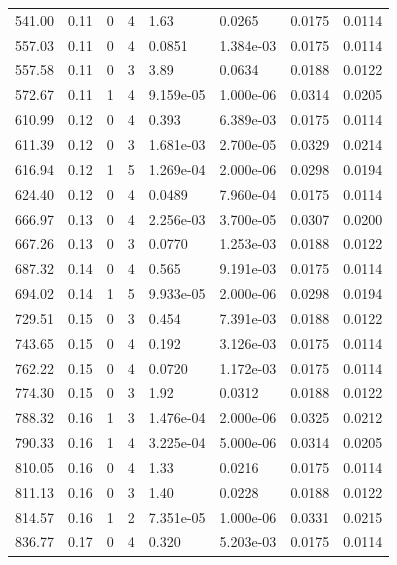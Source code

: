 \documentclass[preview]{standalone}
\begin{document}
{{{\begin{tabular}{L{1.2cm}C{1.2cm} C{0.3cm}C{0.5cm} C{1.4cm}C{1.4cm} C{1.4cm}C{1.4cm}}
  541.00  &  0.11  & 0     &  4 &  1.63  & 0.0265  & 0.0175 &  0.0114   \\ 
  557.03  &  0.11  & 0     &  4 &  0.0851  & 1.384e-03  & 0.0175 &  0.0114   \\ 
  557.58  &  0.11  & 0     &  3 &  3.89  & 0.0634  & 0.0188 &  0.0122   \\ 
  572.67  &  0.11  & 1     &  4 &  9.159e-05  & 1.000e-06  & 0.0314 &  0.0205   \\ 
  610.99  &  0.12  & 0     &  4 &  0.393  & 6.389e-03  & 0.0175 &  0.0114   \\ 
  611.39  &  0.12  & 0     &  3 &  1.681e-03  & 2.700e-05  & 0.0329 &  0.0214   \\ 
  616.94  &  0.12  & 1     &  5 &  1.269e-04  & 2.000e-06  & 0.0298 &  0.0194   \\ 
  624.40  &  0.12  & 0     &  4 &  0.0489  & 7.960e-04  & 0.0175 &  0.0114   \\ 
  666.97  &  0.13  & 0     &  4 &  2.256e-03  & 3.700e-05  & 0.0307 &  0.0200   \\ 
  667.26  &  0.13  & 0     &  3 &  0.0770  & 1.253e-03  & 0.0188 &  0.0122   \\ 
  687.32  &  0.14  & 0     &  4 &  0.565  & 9.191e-03  & 0.0175 &  0.0114   \\ 
  694.02  &  0.14  & 1     &  5 &  9.933e-05  & 2.000e-06  & 0.0298 &  0.0194   \\ 
  729.51  &  0.15  & 0     &  3 &  0.454  & 7.391e-03  & 0.0188 &  0.0122   \\ 
  743.65  &  0.15  & 0     &  4 &  0.192  & 3.126e-03  & 0.0175 &  0.0114   \\ 
  762.22  &  0.15  & 0     &  4 &  0.0720  & 1.172e-03  & 0.0175 &  0.0114   \\ 
  774.30  &  0.15  & 0     &  3 &  1.92  & 0.0312  & 0.0188 &  0.0122   \\ 
  788.32  &  0.16  & 1     &  3 &  1.476e-04  & 2.000e-06  & 0.0325 &  0.0212   \\ 
  790.33  &  0.16  & 1     &  4 &  3.225e-04  & 5.000e-06  & 0.0314 &  0.0205   \\ 
  810.05  &  0.16  & 0     &  4 &  1.33  & 0.0216  & 0.0175 &  0.0114   \\ 
  811.13  &  0.16  & 0     &  3 &  1.40  & 0.0228  & 0.0188 &  0.0122   \\ 
  814.57  &  0.16  & 1     &  2 &  7.351e-05  & 1.000e-06  & 0.0331 &  0.0215   \\ 
  836.77  &  0.17  & 0     &  4 &  0.320  & 5.203e-03  & 0.0175 &  0.0114   \\ 

\end{tabular}}}}
\end{document}
